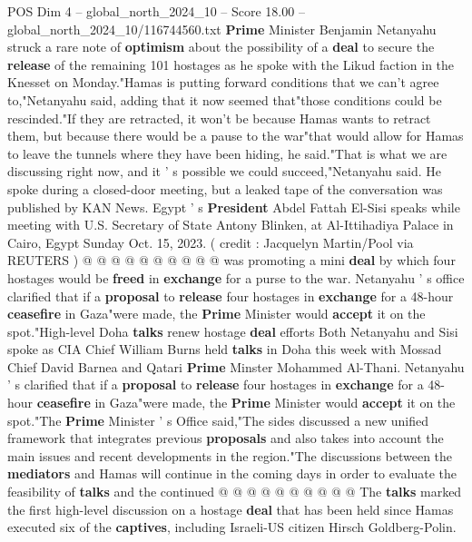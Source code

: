 \begin{textsample}{POS Dim 4 – global\_north\_2024\_10 – Score 18.00 – global\_north\_2024\_10/116744560.txt}  \label{ex:f4_pos_404}
\textbf{Prime} Minister Benjamin Netanyahu struck a rare note of \textbf{optimism} about the possibility of a \textbf{deal} to secure the \textbf{release} of the remaining 101 hostages as he spoke with the Likud faction in the Knesset on Monday."Hamas is putting forward conditions that we can't agree to,"Netanyahu said, adding that it now seemed that"those conditions could be rescinded."If they are retracted, it won't be because Hamas wants to retract them, but because there would be a pause to the war"that would allow for Hamas to leave the tunnels where they have been hiding, he said."That is what we are discussing right now, and it ' s possible we could succeed,"Netanyahu said.
He spoke during a closed-door meeting, but a leaked tape of the conversation was published by KAN News.
Egypt ' s \textbf{President} Abdel Fattah El-Sisi speaks while meeting with U.S.
Secretary of State Antony Blinken, at Al-Ittihadiya Palace in Cairo, Egypt Sunday Oct. 15, 2023. ( credit : Jacquelyn Martin/Pool via REUTERS ) @ @ @ @ @ @ @ @ @ @ was promoting a mini \textbf{deal} by which four hostages would be \textbf{freed} in \textbf{exchange} for a purse to the war.
Netanyahu ' s office clarified that if a \textbf{proposal} to \textbf{release} four hostages in \textbf{exchange} for a 48-hour \textbf{ceasefire} in Gaza"were made, the \textbf{Prime} Minister would \textbf{accept} it on the spot."High-level Doha \textbf{talks} renew hostage \textbf{deal} efforts Both Netanyahu and Sisi spoke as CIA Chief William Burns held \textbf{talks} in Doha this week with Mossad Chief David Barnea and Qatari \textbf{Prime} Minster Mohammed Al-Thani.
Netanyahu ' s clarified that if a \textbf{proposal} to \textbf{release} four hostages in \textbf{exchange} for a 48-hour \textbf{ceasefire} in Gaza"were made, the \textbf{Prime} Minister would \textbf{accept} it on the spot."The \textbf{Prime} Minister ' s Office said,"The sides discussed a new unified framework that integrates previous \textbf{proposals} and also takes into account the main issues and recent developments in the region."The discussions between the \textbf{mediators} and Hamas will continue in the coming days in order to evaluate the feasibility of \textbf{talks} and the continued @ @ @ @ @ @ @ @ @ @ The \textbf{talks} marked the first high-level discussion on a hostage \textbf{deal} that has been held since Hamas executed six of the \textbf{captives}, including Israeli-US citizen Hirsch Goldberg-Polin.

\end{textsample}
